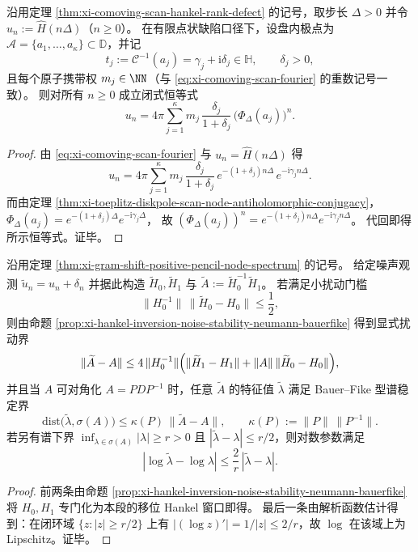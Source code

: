 \begin{proposition}[扫描谱指纹的盘几何反全纯表达]\label{prop:xi-scan-fingerprint-antiholomorphic-functional-of-diskpoles}
沿用定理 \ref{thm:xi-comoving-scan-hankel-rank-defect} 的记号，取步长 \(\Delta>0\) 并令 \(u_n:=\widehat H(n\Delta)\)（\(n\ge 0\)）。
在有限点状缺陷口径下，设盘内极点为 \(\mathcal A=\{a_1,\dots,a_\kappa\}\subset\mathbb{D}\)，并记
\[
t_j:=\mathcal{C}^{-1}(a_j)=\gamma_j+\mathrm{i}\delta_j\in\mathbb{H},
\qquad
\delta_j>0,
\]
且每个原子携带权 \(m_j\in\NN\)（与 \eqref{eq:xi-comoving-scan-fourier} 的重数记号一致）。
则对所有 \(n\ge 0\) 成立闭式恒等式
\[
u_n
=4\pi\sum_{j=1}^{\kappa}m_j\,\frac{\delta_j}{1+\delta_j}\,\bigl(\Phi_\Delta(a_j)\bigr)^{n}.
\]
\end{proposition}
\begin{proof}
由 \eqref{eq:xi-comoving-scan-fourier} 与 \(u_n=\widehat H(n\Delta)\) 得
\[
u_n
=4\pi\sum_{j=1}^{\kappa}m_j\,\frac{\delta_j}{1+\delta_j}\,e^{-(1+\delta_j)n\Delta}\,e^{-\mathrm{i}\gamma_j n\Delta}.
\]
而由定理 \ref{thm:xi-toeplitz-diskpole-scan-node-antiholomorphic-conjugacy}，
\(
\Phi_\Delta(a_j)=e^{-(1+\delta_j)\Delta}e^{-\mathrm{i}\gamma_j\Delta}
\)，
故 \((\Phi_\Delta(a_j))^{n}=e^{-(1+\delta_j)n\Delta}e^{-\mathrm{i}\gamma_j n\Delta}\)。
代回即得所示恒等式。证毕。
\end{proof}

\begin{corollary}\label{cor:xi-node-spectrum-noise-stability}
沿用定理 \ref{thm:xi-gram-shift-positive-pencil-node-spectrum} 的记号。
给定噪声观测 \(\tilde u_n=u_n+\delta_n\) 并据此构造 \(\widetilde H_0,\widetilde H_1\) 与 \(\widetilde A:=\widetilde H_0^{-1}\widetilde H_1\)。
若满足小扰动门槛
\[
\|H_0^{-1}\|\,\|\widetilde H_0-H_0\|\le \frac12,
\]
则由命题 \ref{prop:xi-hankel-inversion-noise-stability-neumann-bauerfike} 得到显式扰动界
\[
\|\widetilde A-A\|
\le 4\,\|H_0^{-1}\|\Bigl(\|\widetilde H_1-H_1\|+\|A\|\,\|\widetilde H_0-H_0\|\Bigr),
\]
并且当 \(A\) 可对角化 \(A=PDP^{-1}\) 时，任意 \(\widetilde A\) 的特征值 \(\widetilde\lambda\) 满足 Bauer--Fike 型谱稳定界
\[
\mathrm{dist}\bigl(\widetilde\lambda,\sigma(A)\bigr)\le \kappa(P)\,\|\widetilde A-A\|,
\qquad \kappa(P):=\|P\|\,\|P^{-1}\|.
\]
若另有谱下界 \(\inf_{\lambda\in\sigma(A)}|\lambda|\ge r>0\) 且 \(|\widetilde\lambda-\lambda|\le r/2\)，则对数参数满足
\[
|\log\widetilde\lambda-\log\lambda|\le \frac{2}{r}\,|\widetilde\lambda-\lambda|.
\]
\end{corollary}
\begin{proof}
前两条由命题 \ref{prop:xi-hankel-inversion-noise-stability-neumann-bauerfike} 将 \(H_0,H_1\) 专门化为本段的移位 Hankel 窗口即得。
最后一条由解析函数估计得到：在闭环域 \(\{z:|z|\ge r/2\}\) 上有 \(|(\log z)'|=1/|z|\le 2/r\)，故 \(\log\) 在该域上为 Lipschitz。证毕。
\end{proof}

